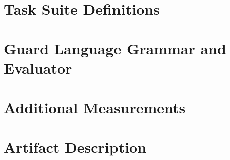 
\chapter{Task Suite Definitions}
\label{app:tasks}

\chapter{Guard Language Grammar and Evaluator}
\label{app:guards}

\chapter{Additional Measurements}
\label{app:data}

\chapter{Artifact Description}
\label{app:artifact}
